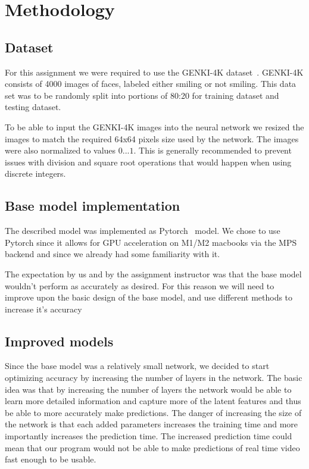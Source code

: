 \documentclass[12pt,a4paper,english
]{tunithesis}
\begin{document}
\chapter{Methodology}
\label{sec:methodology}
\section{Dataset}
For this assignment we were required to use the GENKI-4K dataset~\cite{genki}. GENKI-4K consists of 4000 images of faces, labeled either smiling or not smiling. This data set was to be randomly split into portions of 80:20 for training dataset and testing dataset.

To be able to input the GENKI-4K images into the neural network we resized the images to match the required 64x64 pixels size used by the network. The images were also normalized to values $0...1$. This is generally recommended to prevent issues with division and square root operations that would happen when using discrete integers.


\section{Base model implementation}
The described model was implemented as Pytorch~\cite{pytorch} model. We chose to use Pytorch since it allows for GPU acceleration on M1/M2 macbooks via the MPS backend and since we already had some familiarity with it.

The expectation by us and by the assignment instructor was that the base model wouldn't perform as accurately as desired. For this reason we will need to improve upon the basic design of the base model, and use different methods to increase it's accuracy

\section{Improved models}
Since the base model was a relatively small network, we decided to start optimizing accuracy by increasing the number of layers in the network. The basic idea was that by increasing the number of layers the network would be able to learn more detailed information and capture more of the latent features and thus be able to more accurately make predictions. The danger of increasing the size of the network is that each added parameters increases the training time and more importantly increases the prediction time. The increased prediction time could mean that our program would not be able to make predictions of real time video fast enough to be usable.
\end{document}
